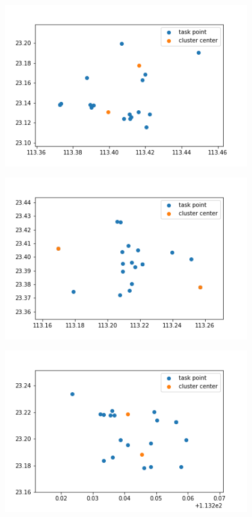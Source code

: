 \begin{figure}
\begin{minipage}[c]{0.3\textwidth}
        \label{fig:sample-figure-c}
    \end{minipage}\\    \begin{minipage}[c]{0.3\textwidth}
        \centering
        \includegraphics[width=0.95\textwidth]{128.png}
        \label{fig:sample-figure-a}
    \end{minipage}
    \begin{minipage}[c]{0.3\textwidth}
        \centering
        \includegraphics[width=0.95\textwidth]{140.png}
        \label{fig:sample-figure-b}
    \end{minipage}
    \begin{minipage}[c]{0.3\textwidth}
        \centering
        \includegraphics[width=0.95\textwidth]{141.png}

\end{minipage}
\end{figure}
